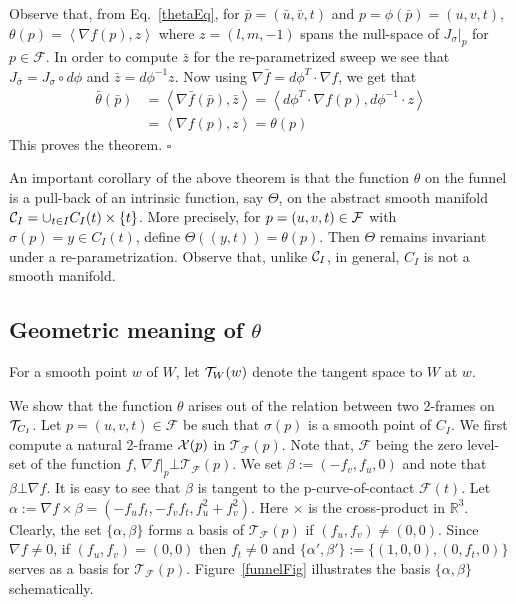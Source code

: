 \documentclass{elsart5p}
\begin{document}
Observe that, from Eq.~\ref{thetaEq}, for $\bar{p}=(\bar{u},\bar{v},t)$ and
$p=\phi(\bar{p})=(u,v,t)$, $\theta(p) = \left < \nabla f(p) , z \right >$
where $z = (l, m, -1) $ spans the null-space of $J_{\sigma}|_p$ for $p \in \mathcal{F}$.  In order to compute $\bar{z}$ for the re-parametrized sweep we see that $J_{\bar{\sigma}} = J_{\sigma} \circ d \phi$ and $\bar{z} = d\phi^{-1} z$. 
Now using $\nabla \bar{f} = d\phi^T \cdot \nabla f$,
we get that 
\begin{align*}
\bar{\theta}(\bar{p}) &= \left < \nabla \bar{f}(\bar{p}), \bar{z} \right >  
=\left< d \phi^T \cdot \nabla f(p), d\phi^{-1} \cdot z \right > \\
			      &= \left < \nabla f(p) , z \right > = \theta(p)
\end{align*}
This proves the theorem.
\hfill $\square$

An important corollary of the above theorem is that the function $\theta$
on the funnel is a pull-back of an intrinsic 
function, say $\Theta$, on the abstract smooth manifold
${\cal C}_I= \cup_{t \in I} C_I(t)\times \{t\}$.
More precisely, for $p=(u,v,t) \in {\cal F}$ with $\sigma(p)=y \in C_I(t)$,
define $\Theta((y,t))=\theta(p)$. Then $\Theta$ remains invariant
under a re-parametrization. Observe that, unlike ${\cal C}_I$, in general,
$C_I$ is not a smooth manifold.


\subsection{Geometric meaning of $\theta$} \label{geomThetaSec}
For a smooth point $w$ of $W$, let ${\cal T}_W(w)$ denote the tangent
space to $W$ at $w$.

We show that the function $\theta$ arises out of the relation between two 2-frames on ${\cal T}_{C_I}$. Let $p = (u,v,t) \in \mathcal{F}$ be such that $\sigma(p)$ is a smooth
point of $C_I$. We first compute a natural 2-frame ${\cal X}(p)$ in $\mathcal{T}_{\mathcal{F}}(p)$. 
Note that, $\mathcal{F}$ being the zero level-set of the function $f$, $\nabla f|_p \bot \mathcal{T}_{\mathcal{F}}(p)$.  
We set $\beta := (-f_v, f_u, 0) $ and note that $\beta \bot \nabla f$. It is easy to see that 
$\beta $ is tangent to the p-curve-of-contact $\mathcal{F}(t)$.  
Let $\alpha := \nabla f \times \beta  = (-f_uf_t, -f_vf_t, f_u^2+f_v^2)$.  
Here $\times$ is the cross-product in $\mathbb{R}^3$. Clearly, the set $\{ \alpha, \beta \}$ forms a basis of $\mathcal{T}_{\mathcal{F}}(p)$ if 
$(f_u, f_v) \neq (0,0)$.  Since $\nabla f \neq 0$, if $(f_u, f_v) = (0,0)$ then $f_t \neq 0$ and $\{\alpha', \beta'\} := 
\{(1, 0, 0), (0, f_t, 0) \}$ serves as a basis for $\mathcal{T}_{\mathcal{F}}(p)$.
Figure~\ref{funnelFig} illustrates the basis $\{\alpha, \beta \}$ schematically. 
\end{document}
